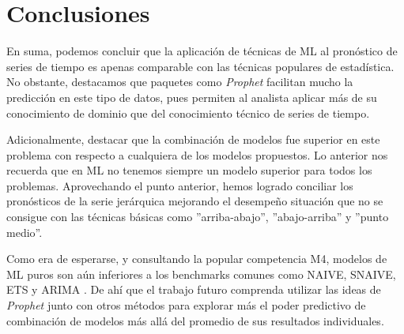\chapter{Conclusiones}

En suma, podemos concluir que la aplicación de técnicas de ML al pronóstico de series de tiempo es apenas comparable con las técnicas populares de estadística. No obstante, destacamos que paquetes como \textit{Prophet} facilitan mucho la predicción en este tipo de datos, pues permiten al analista aplicar más de su conocimiento de dominio que del conocimiento técnico de series de tiempo.

Adicionalmente, destacar que la combinación de modelos fue superior en este problema con respecto a cualquiera de los modelos propuestos. Lo anterior nos recuerda que en ML no tenemos siempre un modelo superior para todos los problemas. Aprovechando el punto anterior, hemos logrado conciliar los pronósticos de la serie jerárquica mejorando el desempeño situación que no se consigue con las técnicas básicas como ''arriba-abajo'', ''abajo-arriba'' y ''punto medio''.

Como era de esperarse, y consultando la popular competencia M4, modelos de ML puros son aún inferiores a los benchmarks comunes como NAIVE, SNAIVE, ETS y ARIMA \cite{makridakis2020m4}. De ahí que el trabajo futuro comprenda utilizar las ideas de \textit{Prophet} junto con otros métodos para explorar más el poder predictivo de combinación de modelos más allá del promedio de sus resultados individuales.

 